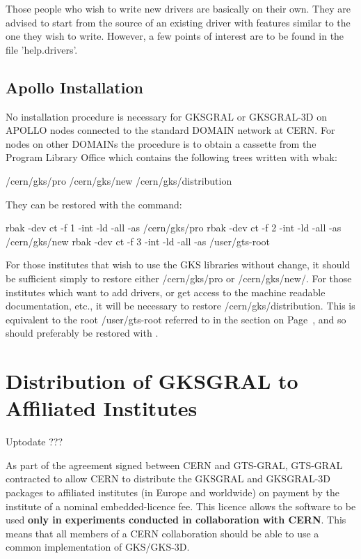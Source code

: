 Those people who wish to write new drivers are basically on their own.
They are advised to start from the source of an existing driver
with features similar to the one they wish to write. However,
a few points of interest are to be found in the file 'help.drivers'.
\section{\protect\label{sec:apodis}Apollo Installation}
 
No installation procedure is necessary for GKSGRAL or GKSGRAL-3D
on APOLLO nodes connected to the standard DOMAIN network at CERN.
For nodes on other DOMAINs the procedure is to obtain
a cassette from the Program Library Office which contains
the following trees written with wbak:

\begin{XMP}
/cern/gks/pro
/cern/gks/new
/cern/gks/distribution
\end{XMP}

They can be restored with the command:

\begin{XMP}
rbak -dev ct -f 1 -int -ld -all -as /cern/gks/pro
rbak -dev ct -f 2 -int -ld -all -as /cern/gks/new
rbak -dev ct -f 3 -int -ld -all -as /user/gts-root
\end{XMP}
 
For those institutes that wish to use the GKS libraries without change,
it should be sufficient simply to restore either /cern/gks/pro or
/cern/gks/new/. For those institutes which want to add drivers, or get
access to the machine readable documentation, etc., it will be necessary to
restore /cern/gks/distribution. This is equivalent to the root
/user/gts-root referred to in the section on Page~\pageref{sec:unixdna},
and so should preferably be restored with .
\chapter{\protect\label{sec:gtsdist}Distribution of GKSGRAL to Affiliated Institutes}
\Lit{$==>$} Uptodate ???
 
As part of the agreement signed between CERN and GTS-GRAL,
GTS-GRAL contracted to allow CERN to distribute the GKSGRAL and GKSGRAL-3D
packages to affiliated institutes (in Europe and worldwide)
on payment by the institute of a nominal embedded-licence fee.
This licence allows the software to be used
{\bf only in experiments conducted in collaboration with CERN}.
This means that all members of a CERN collaboration should be able
to use a common implementation of GKS/GKS-3D.
 
